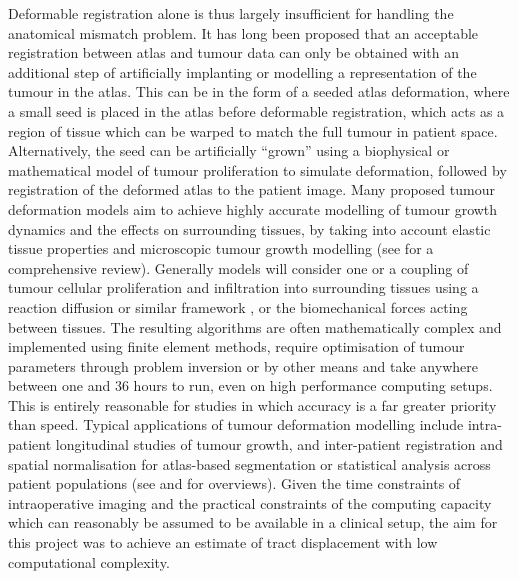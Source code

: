 Deformable registration alone is thus largely insufficient for handling the anatomical mismatch problem\autocite{Elazab2018, Visser2020}.
It has long been proposed that an acceptable registration between atlas and tumour data can only be obtained with an additional step of artificially implanting or modelling a representation of the tumour in the atlas\autocite{Cabezas2011,Mang2020}.
This can be in the form of a seeded atlas deformation\autocite{Dawant2002}, where a small seed is placed in the atlas before deformable registration, which acts as a region of tissue which can be warped to match the full tumour in patient space.
Alternatively, the seed can be artificially ``grown'' using a biophysical or mathematical model of tumour proliferation to simulate deformation, followed by registration of the deformed atlas to the patient image\autocite{Cuadra2004, Zacharaki2009}.
Many proposed tumour deformation models aim to achieve highly accurate modelling of tumour growth dynamics and the effects on surrounding tissues, by taking into account elastic tissue properties and microscopic tumour growth modelling (see \textcite{Elazab2018} for a comprehensive review).
Generally models will consider one or a coupling\autocite{Clatz2005,Hogea2007,Prastawa2009} of tumour cellular proliferation and infiltration into surrounding tissues using a reaction diffusion or similar framework
\autocite{Tunc2021,Scheufele2019b,Elaff2018},
or the biomechanical forces acting between tissues\autocite{Mohamed2006,Hogea2007a,Zacharaki2009}.
The resulting algorithms are often mathematically complex and implemented using finite element methods\autocite{Elazab2018}, require optimisation of tumour parameters through problem inversion or by other means \autocite{Mohamed2006, Zacharaki2009, Mang2020} and take anywhere between one and 36 hours to run, even on high performance computing setups\autocite{Zacharaki2009,Bauer2012,Gooya2012,Bauer2013,Mang2012}.
This is entirely reasonable for studies in which accuracy is a far greater priority than speed.
Typical applications of tumour deformation modelling include intra-patient longitudinal studies of tumour growth, and inter-patient registration and spatial normalisation for atlas-based segmentation or statistical analysis across patient populations (see \textcite{Bauer2013} and \textcite{Cabezas2011} for overviews).
Given the time constraints of intraoperative imaging and the practical constraints of the computing capacity which can reasonably be assumed to be available in a clinical setup, the aim for this project was to achieve an estimate of tract displacement with low computational complexity.

